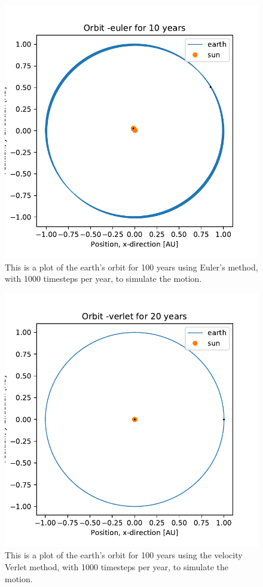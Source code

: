 \begin{figure}[H]
\includegraphics[width=1.1\linewidth]{../results/plots/plotof-earthsun-euler.pdf}\caption{This is a plot of the earth's orbit for 100 years using Euler's method, with 1000 timesteps per year, to simulate the motion.}\label{fig:earth-sun-euler}
\end{figure}		
	
\begin{figure}[H]
\includegraphics[width=1.1\linewidth]{../results/plots/plotof-earthsun-verlet.pdf}\caption{This is a plot of the earth's orbit for 100 years using the velocity Verlet method, with 1000 timesteps per year, to simulate the motion.}\label{fig:earth-sun-verlet}
\end{figure}	

